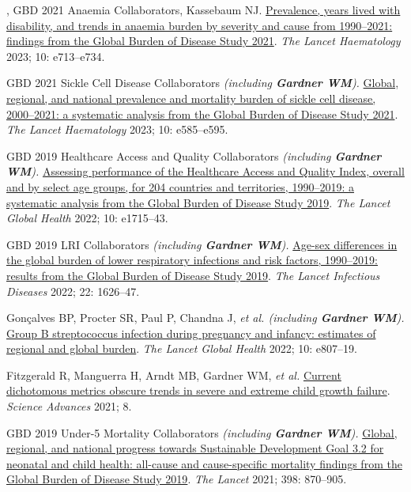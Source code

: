 \documentclass[11pt,article,oneside]{memoir}
\begin{document}
, GBD 2021 Anaemia Collaborators, Kassebaum NJ. \href{https://doi.org/10.1016/S2352-3026(23)00160-6}{Prevalence, years lived with disability, and trends in anaemia burden by severity 
and cause from 1990--2021: findings from the Global Burden of Disease Study 2021}. \emph{The Lancet Haematology} 2023; 10: e713--e734.

\ind GBD 2021 Sickle Cell Disease Collaborators \emph{(including \textbf{Gardner WM}).} \href{https://doi.org/10.1016/S2352-3026(23)00118-7}{Global, regional, and national prevalence and mortality burden of sickle cell disease, 2000--2021: 
a systematic analysis from the Global Burden of Disease Study 2021}. \emph{The Lancet Haematology} 2023; 10: e585--e595.

\ind GBD 2019 Healthcare Access and Quality Collaborators \emph{(including \textbf{Gardner WM}).} \href{https://doi.org/10.1016/S2214-109X(22)00429-6}{Assessing performance of
the Healthcare Access and Quality Index, overall and by select age groups, for 204 countries and territories,
1990--2019: a systematic analysis from the Global Burden of Disease Study 2019}. \emph{The Lancet Global Health} 2022; 10: e1715--43.

\ind GBD 2019 LRI Collaborators \emph{(including \textbf{Gardner WM}).} \href{https://doi.org/10.1016/S1473-3099(22)00510-2}{Age-sex differences in the global burden of lower
respiratory infections and risk factors, 1990--2019: results from the Global Burden of Disease Study 2019}. \emph{The Lancet Infectious Diseases} 2022; 22: 1626--47.

\ind Gonçalves BP, Procter SR, Paul P, Chandna J, \emph{et al. (including \textbf{Gardner WM}).} \href{https://doi.org/10.1016/S2214-109X(22)00093-6}{Group B streptococcus infection during pregnancy 
and infancy: estimates of regional and global burden}. \emph{The Lancet Global Health} 2022; 10: e807--19.

\ind Fitzgerald R, Manguerra H, Arndt MB, {\minbold Gardner WM}, \emph{et al.} \href{https://doi.org/10.1126/sciadv.abm8954}{Current dichotomous metrics obscure trends in
severe and extreme child growth failure}. \emph{Science Advances} 2021; 8.

\ind GBD 2019 Under-5 Mortality Collaborators \emph{(including \textbf{Gardner WM}).} \href{https://doi.org/10.1016/S0140-6736(21)01207-1}{Global, regional, and national progress
towards Sustainable Development Goal 3.2 for neonatal and child health: all-cause and cause-specific
mortality findings from the Global Burden of Disease Study 2019}. \emph{The Lancet} 2021; 398: 870--905.
\end{document}

